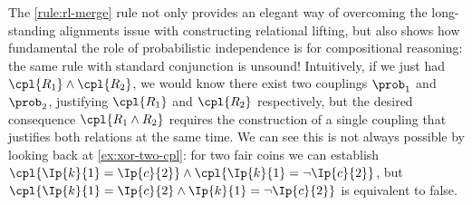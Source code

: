 The \ref{rule:rl-merge} rule not only provides an elegant way of overcoming
the long-standing alignments issue with constructing relational lifting,
but also shows how fundamental the role of probabilistic independence is
for compositional reasoning:
the same rule with standard conjunction is unsound!
Intuitively, if we just had $ \cpl{R_1} \land \cpl{R_2} $,
we would know there exist two couplings
$\prob_1$ and $\prob_2$,
justifying $\cpl{R_1}$ and $\cpl{R_2}$ respectively,
but the desired consequence $\cpl{R_1 \land R_2}$
requires the construction of a single coupling that justifies both relations
at the same time.
We can see this is not always possible by looking back at
\eqref{ex:xor-two-cpl}:
for two fair coins we can establish
$
  \cpl{ \Ip{k}{1} = \Ip{c}{2} }
  \land
  \cpl{ \Ip{k}{1} = \neg\Ip{c}{2} }
$,
but
$
  \cpl{
    \Ip{k}{1} = \Ip{c}{2}
    \land
    \Ip{k}{1} = \neg\Ip{c}{2}
  }
$ is equivalent to false.
